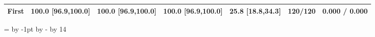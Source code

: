 \begin{table}[!htbp]
{\begin{tabular}{lrrrrrr}
First & \cellcolor{ebCoral!35}\textbf{100.0} \textcolor{black!60}{[96.9,100.0]} & \cellcolor{ebCoral!35}\textbf{100.0} \textcolor{black!60}{[96.9,100.0]} & \cellcolor{ebCoral!35}\textbf{100.0} \textcolor{black!60}{[96.9,100.0]} & 25.8 \textcolor{black!60}{[18.8,34.3]} & 120/120 & 0.000 / 0.000 \\
\bottomrule
\end{tabular}}
\setlength{\tabcolsep}{0pt}
=\linewidth\advance{} by -1pt\advance{} by -\divide{} by 14
\ifdim\dimen0<1.5pt \dimen0=1.5pt\fi
\setlength{\tabcolsep}{\dimen0}\familytab
\end{table}
